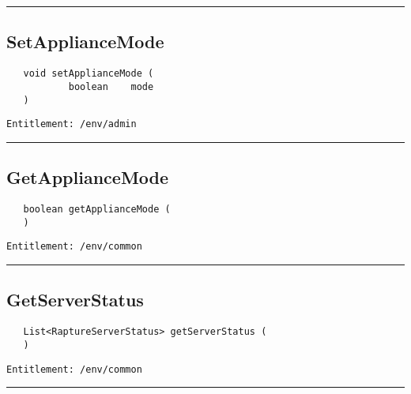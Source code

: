 \rule{12cm}{2pt}
\subsection{SetApplianceMode}
\label{Api:SetApplianceMode}
\begin{verbatim}
   void setApplianceMode (
           boolean    mode
   )
\end{verbatim}
\begin{Verbatim}[fontsize=\small, formatcom=\color{Maroon}]
  Entitlement: /env/admin
\end{Verbatim}



\rule{12cm}{2pt}
\subsection{GetApplianceMode}
\label{Api:GetApplianceMode}
\begin{verbatim}
   boolean getApplianceMode (
   )
\end{verbatim}
\begin{Verbatim}[fontsize=\small, formatcom=\color{Maroon}]
  Entitlement: /env/common
\end{Verbatim}



\rule{12cm}{2pt}
\subsection{GetServerStatus}
\label{Api:GetServerStatus}
\begin{verbatim}
   List<RaptureServerStatus> getServerStatus (
   )
\end{verbatim}
\begin{Verbatim}[fontsize=\small, formatcom=\color{Maroon}]
  Entitlement: /env/common
\end{Verbatim}



\rule{12cm}{2pt}
